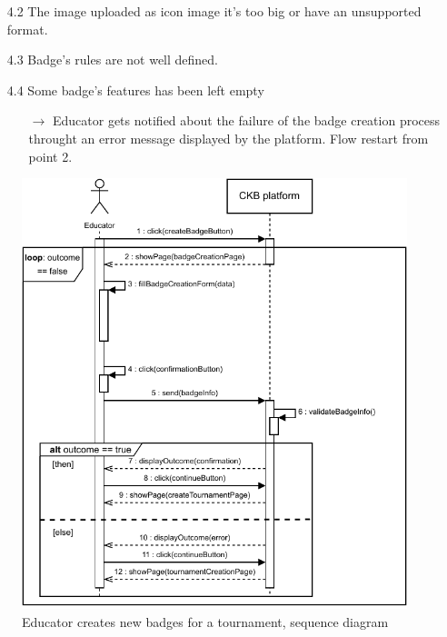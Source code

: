 \documentclass{article}
\begin{document}
{\begin{enumerate}
\begin{xltabular}{\textwidth}
\begin{itemize}
                                                    \item[4.2] The image uploaded as icon image it's too big or have an unsupported format.
                                                    \item[4.3] Badge's rules are not well defined.   
                                                    \item[4.4] Some badge's features has been left empty  
                                                    \begin{itemize}
                                                        \item[$\rightarrow$] Educator gets notified about the failure of the badge creation
                                                        process throught an error message displayed by the platform. Flow restart from point 2.
                                                    \end{itemize} 
                                                \end{itemize}
                    \end{xltabular}
                    
                    \begin{figure}[H]
                        \centering
                        \includegraphics[scale=0.95]{SequenceDiagrams/Sequence4.pdf}
                        \caption{Educator creates new badges for a tournament, sequence diagram}
                        \label{fig:BadgesCreationSeqDiagram}
                    \end{figure}


\end{enumerate}}
\end{document}
